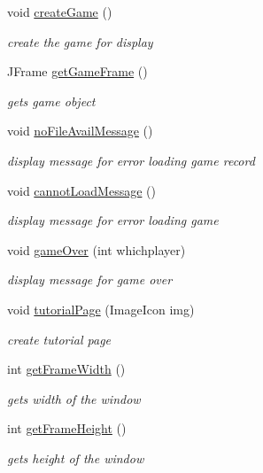 \begin{DoxyCompactItemize}
void \hyperlink{classview_1_1_game_view_aabb001fdf15e7c066c9dbc588f720cd6}{create\+Game} ()
\begin{DoxyCompactList}\small\item\em create the game for display \end{DoxyCompactList}\item 
J\+Frame \hyperlink{classview_1_1_game_view_a35853d75ec07ee29d9257c1785508f02}{get\+Game\+Frame} ()
\begin{DoxyCompactList}\small\item\em gets game object \end{DoxyCompactList}\item 
void \hyperlink{classview_1_1_game_view_a7320789eb48e8b661a1f3a522ef592fb}{no\+File\+Avail\+Message} ()
\begin{DoxyCompactList}\small\item\em display message for error loading game record \end{DoxyCompactList}\item 
void \hyperlink{classview_1_1_game_view_aba828f9bc44d416b7b7c03f71a927dbb}{cannot\+Load\+Message} ()
\begin{DoxyCompactList}\small\item\em display message for error loading game \end{DoxyCompactList}\item 
void \hyperlink{classview_1_1_game_view_ae91ec8b4d72ed56783b2f5c84a9ff869}{game\+Over} (int whichplayer)
\begin{DoxyCompactList}\small\item\em display message for game over \end{DoxyCompactList}\item 
void \hyperlink{classview_1_1_game_view_a67fd4999f1be51ce360b8bba68e87d9c}{tutorial\+Page} (Image\+Icon img)
\begin{DoxyCompactList}\small\item\em create tutorial page \end{DoxyCompactList}\item 
int \hyperlink{classview_1_1_game_view_a729fea181bb79a2767e11f8c7be01711}{get\+Frame\+Width} ()
\begin{DoxyCompactList}\small\item\em gets width of the window \end{DoxyCompactList}\item 
int \hyperlink{classview_1_1_game_view_a741912e646a65f33e3c571002ed0cf22}{get\+Frame\+Height} ()
\begin{DoxyCompactList}\small\item\em gets height of the window \end{DoxyCompactList}\end{DoxyCompactItemize}
